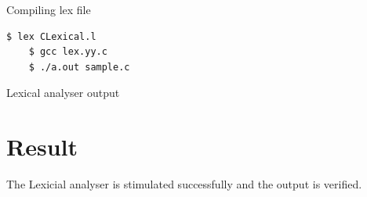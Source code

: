 \vspace{0.5cm}
Compiling lex file
\begin{lstlisting}[style=Terminal]
	$ lex CLexical.l
	$ gcc lex.yy.c
	$ ./a.out sample.c
\end{lstlisting}

\vspace{0.5cm}
Lexical analyser output


\section{Result}
The Lexicial analyser is stimulated successfully and the output is verified.